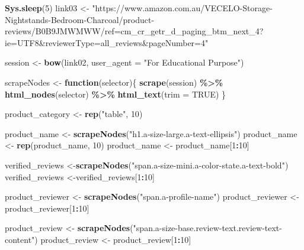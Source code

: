 \documentclass[
]{article}
\newenvironment{Shaded}{\begin{snugshade}}{\end{snugshade}}
\newcommand{\AttributeTok}[1]{\textcolor[rgb]{0.13,0.29,0.53}{#1}}
\newcommand{\ConstantTok}[1]{\textcolor[rgb]{0.56,0.35,0.01}{#1}}
\newcommand{\ControlFlowTok}[1]{\textcolor[rgb]{0.13,0.29,0.53}{\textbf{#1}}}
\newcommand{\DecValTok}[1]{\textcolor[rgb]{0.00,0.00,0.81}{#1}}
\newcommand{\FunctionTok}[1]{\textcolor[rgb]{0.13,0.29,0.53}{\textbf{#1}}}
\newcommand{\NormalTok}[1]{#1}
\newcommand{\OtherTok}[1]{\textcolor[rgb]{0.56,0.35,0.01}{#1}}
\newcommand{\SpecialCharTok}[1]{\textcolor[rgb]{0.81,0.36,0.00}{\textbf{#1}}}
\newcommand{\StringTok}[1]{\textcolor[rgb]{0.31,0.60,0.02}{#1}}
\begin{document}
\begin{Shaded}
\begin{Highlighting}[]
   \FunctionTok{Sys.sleep}\NormalTok{(}\DecValTok{5}\NormalTok{)}
\NormalTok{link03 }\OtherTok{\textless{}{-}} \StringTok{"https://www.amazon.com.au/VECELO{-}Storage{-}Nightstands{-}Bedroom{-}Charcoal/product{-}reviews/B0B9JMWMWW/ref=cm\_cr\_getr\_d\_paging\_btm\_next\_4?ie=UTF8\&reviewerType=all\_reviews\&pageNumber=4"}


\NormalTok{  session }\OtherTok{\textless{}{-}} \FunctionTok{bow}\NormalTok{(link02,}
               \AttributeTok{user\_agent =} \StringTok{"For Educational Purpose"}\NormalTok{)}

\NormalTok{  scrapeNodes }\OtherTok{\textless{}{-}} \ControlFlowTok{function}\NormalTok{(selector)\{}
    \FunctionTok{scrape}\NormalTok{(session) }\SpecialCharTok{\%\textgreater{}\%}
      \FunctionTok{html\_nodes}\NormalTok{(selector) }\SpecialCharTok{\%\textgreater{}\%}
      \FunctionTok{html\_text}\NormalTok{(}\AttributeTok{trim =} \ConstantTok{TRUE}\NormalTok{)}
\NormalTok{  \}}

\NormalTok{  product\_category }\OtherTok{\textless{}{-}} \FunctionTok{rep}\NormalTok{(}\StringTok{"table"}\NormalTok{, }\DecValTok{10}\NormalTok{)}

\NormalTok{  product\_name }\OtherTok{\textless{}{-}} \FunctionTok{scrapeNodes}\NormalTok{(}\StringTok{"h1.a{-}size{-}large.a{-}text{-}ellipsis"}\NormalTok{)}
\NormalTok{  product\_name }\OtherTok{\textless{}{-}} \FunctionTok{rep}\NormalTok{(product\_name, }\DecValTok{10}\NormalTok{)}
\NormalTok{  product\_name }\OtherTok{\textless{}{-}}\NormalTok{ product\_name[}\DecValTok{1}\SpecialCharTok{:}\DecValTok{10}\NormalTok{]}
  
\NormalTok{  verified\_reviews }\OtherTok{\textless{}{-}}\FunctionTok{scrapeNodes}\NormalTok{(}\StringTok{"span.a{-}size{-}mini.a{-}color{-}state.a{-}text{-}bold"}\NormalTok{)}
\NormalTok{  verified\_reviews }\OtherTok{\textless{}{-}}\NormalTok{verified\_reviews[}\DecValTok{1}\SpecialCharTok{:}\DecValTok{10}\NormalTok{]}
  
\NormalTok{  product\_reviewer }\OtherTok{\textless{}{-}} \FunctionTok{scrapeNodes}\NormalTok{(}\StringTok{"span.a{-}profile{-}name"}\NormalTok{)}
\NormalTok{  product\_reviewer }\OtherTok{\textless{}{-}}\NormalTok{ product\_reviewer[}\DecValTok{1}\SpecialCharTok{:}\DecValTok{10}\NormalTok{]}
  
\NormalTok{  product\_review }\OtherTok{\textless{}{-}} \FunctionTok{scrapeNodes}\NormalTok{(}\StringTok{"span.a{-}size{-}base.review{-}text.review{-}text{-}content"}\NormalTok{)}
\NormalTok{  product\_review }\OtherTok{\textless{}{-}}\NormalTok{ product\_review[}\DecValTok{1}\SpecialCharTok{:}\DecValTok{10}\NormalTok{]}
  

\end{Highlighting}
\end{Shaded}
\end{document}
